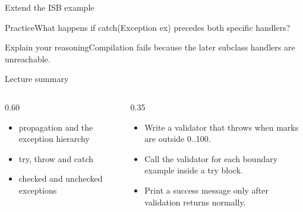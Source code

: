 \documentclass[10pt,aspectratio=169]{beamer}
\begin{document}
\begin{frame}[fragile,t]{Extend the ISB example}
\begin{alertblock}{Practice}What happens if catch(\allowbreak Exception ex) precedes both specific handlers?\end{alertblock}\vspace{3mm}\begin{exampleblock}{Explain your reasoning}Compilation fails because the later subclass handlers are unreachable.\end{exampleblock}
\end{frame}
\begin{frame}[fragile,t]{Lecture summary}
\begin{columns}[T,onlytextwidth]\begin{column}{0.60\textwidth}
\begin{itemize}
\item propagation and the exception hierarchy
\item try, throw and catch
\item checked and unchecked exceptions
\end{itemize}
\end{column}\begin{column}{0.35\textwidth}\small
\begin{itemize}
\item Write a validator that throws when marks are outside 0..100.
\item Call the validator for each boundary example inside a try block.
\item Print a success message only after validation returns normally.
\end{itemize}
\end{column}\end{columns}
\end{frame}
\end{document}
